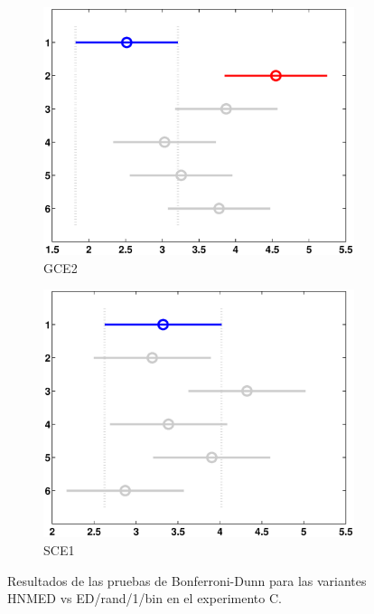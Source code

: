 \begin{figure}
\begin{subfigure}[b]{0.49\linewidth}
		\includegraphics[width=\linewidth]{Figures/C-Bonferroni_HNMED_VS_ED5}
		\caption{GCE2} \label{fig:Bon_G2} 
	\end{subfigure}
	\begin{subfigure}[b]{0.49\linewidth}
		\includegraphics[width=\linewidth]{Figures/C-Bonferroni_HNMED_VS_ED6}
		\caption{SCE1} \label{fig:Bon_S1} 
	\end{subfigure}
	\caption{Resultados de las pruebas de Bonferroni-Dunn para las variantes HNMED vs ED/rand/1/bin en el experimento C.} \label{fig: Resultados de las pruebas de Bonferroni-Dunn para las variantes HNMED vs ED/rand/1/bin en el experimento C.} 
	
\end{figure}
